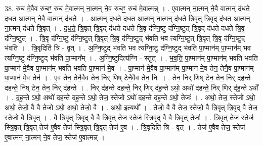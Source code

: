 \documentclass[17pt]{extarticle}
\begin{document}
38. रुच॑ मे॒वैव रुचꣳ॒॒ रुच॑ मे॒वात्मन् ना॒त्मन् ने॒व रुचꣳ॒॒ रुच॑ मे॒वात्मन्न् । . ए॒वात्मन् ना॒त्मन् ने॒वै वात्मन् द॑धते दधत आ॒त्मन् ने॒वै वात्मन् द॑धते । . आ॒त्मन् द॑धते दधत आ॒त्मन् ना॒त्मन् द॑धते त्रि॒वृत् त्रि॒वृद् द॑धत आ॒त्मन् ना॒त्मन् द॑धते त्रि॒वृत् । . द॒ध॒ते॒ त्रि॒वृत् त्रि॒वृद् द॑धते दधते त्रि॒वृ द॑ग्नि॒ष्टु द॑ग्नि॒ष्टुत् त्रि॒वृद् द॑धते दधते त्रि॒वृ द॑ग्नि॒ष्टुत् । . त्रि॒वृ द॑ग्नि॒ष्टु द॑ग्नि॒ष्टुत् त्रि॒वृत् त्रि॒वृ द॑ग्नि॒ष्टुद् भ॑वति भव त्यग्नि॒ष्टुत् त्रि॒वृत् त्रि॒वृ द॑ग्नि॒ष्टुद् भ॑वति । . त्रि॒वृदिति॑ त्रि - वृत् । . अ॒ग्नि॒ष्टुद् भ॑वति भव त्यग्नि॒ष्टु द॑ग्नि॒ष्टुद् भ॑वति पा॒प्मान॑म् पा॒प्मान॑म् भव त्यग्नि॒ष्टु द॑ग्नि॒ष्टुद् भ॑वति पा॒प्मान᳚म् । . अ॒ग्नि॒ष्टुदित्य॑ग्नि - स्तुत् । . भ॒व॒ति॒ पा॒प्मान॑म् पा॒प्मान॑म् भवति भवति पा॒प्मान॑ मे॒वैव पा॒प्मान॑म् भवति भवति पा॒प्मान॑ मे॒व । . पा॒प्मान॑ मे॒वैव पा॒प्मान॑म् पा॒प्मान॑ मे॒व तेन॒ तेनै॒व पा॒प्मान॑म् पा॒प्मान॑ मे॒व तेन॑ । . ए॒व तेन॒ तेनै॒वैव तेन॒ निर् णिष् टेनै॒वैव तेन॒ निः । . तेन॒ निर् णिष् टेन॒ तेन॒ निर् द॑हन्ते दहन्ते॒ निष् टेन॒ तेन॒ निर् द॑हन्ते । . निर् द॑हन्ते दहन्ते॒ निर् णिर् द॑ह॒न्ते ऽथो॒ अथो॑ दहन्ते॒ निर् णिर् द॑ह॒न्ते ऽथो᳚ । . द॒ह॒न्ते ऽथो॒ अथो॑ दहन्ते दह॒न्ते ऽथो॒ तेज॒ स्तेजो ऽथो॑ दहन्ते दह॒न्ते ऽथो॒ तेजः॑ । . अथो॒ तेज॒ स्तेजो ऽथो॒ अथो॒ तेजो॒ वै वै तेजो ऽथो॒ अथो॒ तेजो॒ वै । . अथो॒ इत्यथो᳚ । . तेजो॒ वै वै तेज॒ स्तेजो॒ वै त्रि॒वृत् त्रि॒वृद् वै तेज॒ स्तेजो॒ वै त्रि॒वृत् । . वै त्रि॒वृत् त्रि॒वृद् वै वै त्रि॒वृत् तेज॒ स्तेज॑ स्त्रि॒वृद् वै वै त्रि॒वृत् तेजः॑ । . त्रि॒वृत् तेज॒ स्तेज॑ स्त्रि॒वृत् त्रि॒वृत् तेज॑ ए॒वैव तेज॑ स्त्रि॒वृत् त्रि॒वृत् तेज॑ ए॒व । . त्रि॒वृदिति॑ त्रि - वृत् । . तेज॑ ए॒वैव तेज॒ स्तेज॑ ए॒वात्मन् ना॒त्मन् ने॒व तेज॒ स्तेज॑ ए॒वात्मन्न् । \newline
\end{document}

